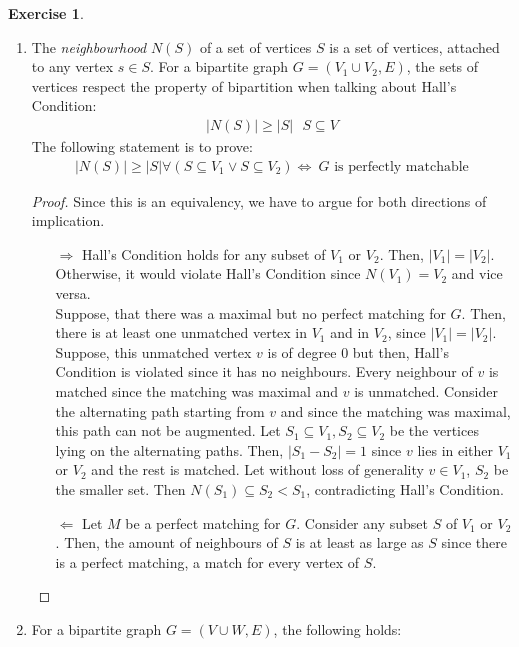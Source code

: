 \documentclass[a4paper,12pt,headsepline]{scrartcl}
\newtheorem{aufgabe}{Exercise}
\begin{document}
\begin{aufgabe}
\end{aufgabe}
\begin{enumerate}
	\item The \textit{neighbourhood} $N(S)$ of a set of vertices $S$ is a set of vertices, attached to any vertex $s\in S$. For a bipartite graph $G = (V_1 \cup V_2, E)$, the sets of vertices respect the property of bipartition when talking about Hall's Condition:
	\begin{align*}
	|N(S)| \geq |S| ~~~ S\subseteq V
	\end{align*}
	The following statement is to prove:
	\begin{align*}
	|N(S)| \geq |S| \forall (S\subseteq V_1 \vee S\subseteq V_2) \Leftrightarrow~G \text{ is perfectly matchable}
	\end{align*}
	\begin{proof}Since this is an equivalency, we have to argue for both directions of implication.
		\begin{itemize}
			\item[$\Rightarrow$] Hall's Condition holds for any subset of $V_1$ or $V_2$. Then, $|V_1| = |V_2|$. Otherwise, it would violate Hall's Condition since $N(V_1) = V_2$ and vice versa.\\
			Suppose, that there was a maximal but no perfect matching for $G$. Then, there is at least one unmatched vertex in $V_1$ and in $V_2$, since $|V_1| = |V_2|$. Suppose, this unmatched vertex $v$ is of degree 0 but then, Hall's Condition is violated since it has no neighbours. Every neighbour of $v$ is matched since the matching was maximal and $v$ is unmatched. Consider the alternating path starting from $v$ and since the matching was maximal, this path can not be augmented.  Let $S_1 \subseteq V_1, S_2\subseteq V_2$ be the vertices lying on the alternating paths. Then, $|S_1 - S_2| = 1$ since $v$ lies in either $V_1$ or $V_2$ and the rest is matched. Let without loss of generality $v\in V_1$, $S_2$ be the smaller set. Then $N(S_1) \subseteq S_2 < S_1$, contradicting Hall's Condition.
			\item[$\Leftarrow$] Let $M$ be a perfect matching for $G$. Consider any subset $S$ of $V_1$ or $V_2$. Then, the amount of neighbours of $S$ is at least as large as $S$ since there is a perfect matching, a match for every vertex of $S$.
		\end{itemize}
	\end{proof}
	\item For a bipartite graph $G = (V \cup W,E)$, the following holds:

\end{enumerate}
\end{document}
